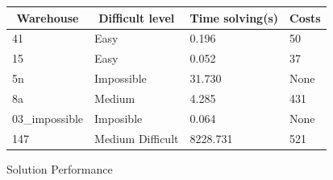 \documentclass[a4paper,12pt]{article}
\begin{document}
\begin{figure}[h]
    \centering
    \begin{tabular}{|l|l|l|l|}
    \hline
    \multicolumn{1}{|c|}{Warehouse} & \multicolumn{1}{c|}{Difficult level} & \multicolumn{1}{c|}{Time solving(s)} & \multicolumn{1}{c|}{Costs} \\ \hline
    41                              & Easy                                 & 0.196                                & 50                         \\ \hline
    15                              & Easy                                 & 0.052                                & 37                         \\ \hline
    5n                              & Impossible                           & 31.730                               & None                       \\ \hline
    8a                              & Medium                               & 4.285                                & 431                        \\ \hline
    03\_impossible                  & Imposible                            & 0.064                                & None                       \\ \hline
    147                             & Medium Difficult                     & 8228.731                             & 521                        \\ \hline
    \end{tabular}
    \caption{Solution Performance}
\end{figure}
\end{document}

